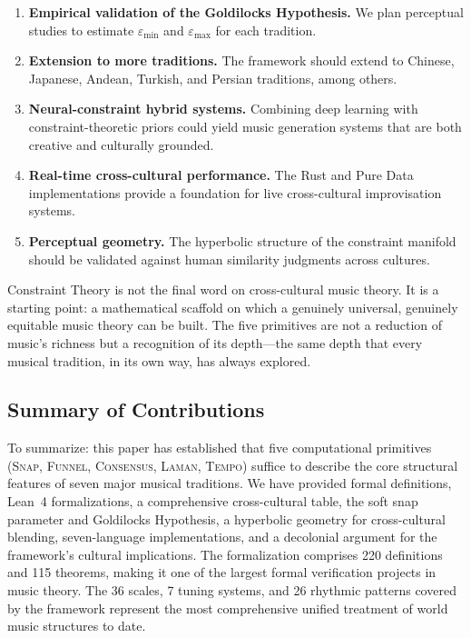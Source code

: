 \documentclass[cmj]{article}
\newcommand{\eps}{\varepsilon}
\newcommand{\SNAP}{\textsc{Snap}}
\newcommand{\FUNNEL}{\textsc{Funnel}}
\newcommand{\CONSENSUS}{\textsc{Consensus}}
\newcommand{\LAMAN}{\textsc{Laman}}
\newcommand{\TEMPO}{\textsc{Tempo}}
\begin{document}
\begin{enumerate}[nosep]
  \item \textbf{Empirical validation of the Goldilocks Hypothesis.} We plan
    perceptual studies to estimate $\eps_{\min}$ and $\eps_{\max}$ for each
    tradition.
  \item \textbf{Extension to more traditions.} The framework should extend
    to Chinese, Japanese, Andean, Turkish, and Persian traditions, among
    others.
  \item \textbf{Neural-constraint hybrid systems.} Combining deep learning
    with constraint-theoretic priors could yield music generation systems that
    are both creative and culturally grounded.
  \item \textbf{Real-time cross-cultural performance.} The Rust and Pure Data
    implementations provide a foundation for live cross-cultural improvisation
    systems.
  \item \textbf{Perceptual geometry.} The hyperbolic structure of the
    constraint manifold should be validated against human similarity judgments
    across cultures.
\end{enumerate}

Constraint Theory is not the final word on cross-cultural music theory. It is
a starting point: a mathematical scaffold on which a genuinely universal,
genuinely equitable music theory can be built. The five primitives are not a
reduction of music's richness but a recognition of its depth---the same depth
that every musical tradition, in its own way, has always explored.

\subsection*{Summary of Contributions}

To summarize: this paper has established that five computational primitives
(\SNAP{}, \FUNNEL{}, \CONSENSUS{}, \LAMAN{}, \TEMPO{}) suffice to describe
the core structural features of seven major musical traditions. We have
provided formal definitions, Lean~4 formalizations, a comprehensive
cross-cultural table, the soft snap parameter and Goldilocks Hypothesis, a
hyperbolic geometry for cross-cultural blending, seven-language implementations,
and a decolonial argument for the framework's cultural implications. The
formalization comprises 220 definitions and 115 theorems, making it one of the
largest formal verification projects in music theory. The 36 scales, 7 tuning
systems, and 26 rhythmic patterns covered by the framework represent the most
comprehensive unified treatment of world music structures to date.
\end{document}

